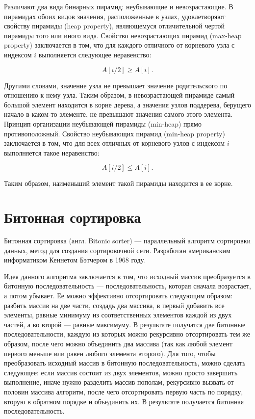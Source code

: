 Различают два вида бинарных пирамид: неубывающие и невозрастающие.
В пирамидах обоих видов значения, расположенные в узлах, удовлетворяют свойству пирамиды (heap property), являющемуся отличительной чертой пирамиды того или иного вида.
Свойство невозрастающих пирамид (max-heap property) заключается в том, что для каждого отличного от корневого узла с индексом $i$ выполняется следующее неравенство:

\begin{equation}
	A[i / 2] \geq A[i].
\end{equation}

Другими словами, значение узла не превышает значение родительского по отношению к нему узла. Таким образом, в невозрастающей пирамиде самый большой элемент находится в корне дерева, а значения узлов поддерева, берущего начало в каком-то элементе, не превышают значения самого этого элемента. Принцип организации неубывающей пирамиды (min-heap) прямо противоположный. Свойство неубывающих пирамид (min-heap property) заключается в том, что для всех отличных от корневого узлов с индексом $i$ выполняется такое неравенство:

\begin{equation}
	A[i / 2] \leq A[i].
\end{equation}

Таким образом, наименьший элемент такой пирамиды находится в ее корне.

\section{Битонная сортировка}

Битонная сортировка (англ. Bitonic sorter) — параллельный алгоритм сортировки данных, метод для создания сортировочной сети. Разработан американским информатиком Кеннетом Бэтчером в 1968 году.

Идея данного алгоритма заключается в том, что исходный массив преобразуется в битонную последовательность --- последовательность, которая сначала возрастает, а потом убывает.
Ее можно эффективно отсортировать следующим образом: разбить массив на две части, создадь два массива, в первый добавить все элементы, равные минимуму из соответственных элементов каждой из двух частей, а во второй --- равные максимуму.
В результате получатся две битонные последовательности, каждую из которых можно рекурсивно отсортировать тем же образом, после чего можно объединить два массива (так как любой элемент первого меньше или равен любого элемента второго).
Для того, чтобы преобразовать исходный массив в битонную последовательность, можно сделать следующее: если массив состоит из двух элементов, можно просто завершить выполнение, иначе нужно разделить массив пополам, рекурсивно вызвать от половин массива алгоритм, после чего отсортировать первую часть по порядку, вторую в обратном порядке и объединить их.
В результате получается битонная последовательность.

